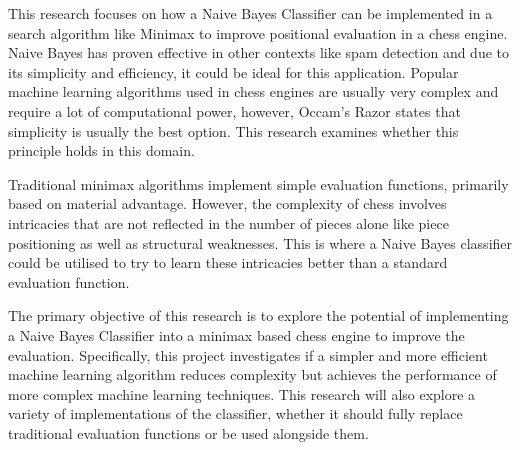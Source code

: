 \documentclass[20pt]{informatics-report}
\begin{document}
This research focuses on how a Naive Bayes Classifier can be implemented in a search algorithm like Minimax to improve positional evaluation in a chess engine. Naive Bayes has proven effective in other contexts like spam detection and due to its simplicity and efficiency, it could be ideal for this application. Popular machine learning algorithms used in chess engines are usually very complex and require a lot of computational power, however, Occam's Razor states that simplicity is usually the best option. This research examines whether this principle holds in this domain. 

Traditional minimax algorithms implement simple evaluation functions, primarily based on material advantage. However, the complexity of chess involves intricacies that are not reflected in the number of pieces alone like piece positioning as well as structural weaknesses. This is where a Naive Bayes classifier could be utilised to try to learn these intricacies better than a standard evaluation function.

The primary objective of this research is to explore the potential of implementing a Naive Bayes Classifier into a minimax based chess engine to improve the evaluation. Specifically, this project investigates if a simpler and more efficient machine learning algorithm reduces complexity but achieves the performance of more complex machine learning techniques. This research will also explore a variety of implementations of the classifier, whether it should fully replace traditional evaluation functions or be used alongside them.






% 

% 
% 
% 








% 
% 
% 
\end{document}
